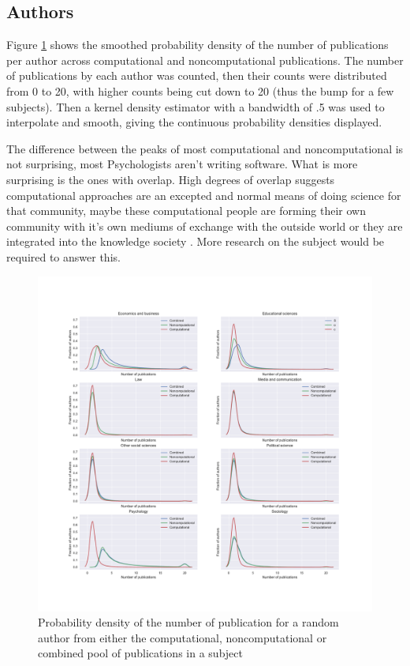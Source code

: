\documentclass[12pt, a4paper]{article}
\begin{document}
\subsection{Authors}

Figure \ref{auths} shows the smoothed probability density of the number of publications per author across computational and noncomputational publications. The number of publications by each author was counted, then their counts were distributed from 0 to 20, with higher counts being cut down to 20 (thus the bump for a few subjects). Then a kernel density estimator with a bandwidth of .5 was used to interpolate and smooth, giving the continuous probability densities displayed.

The difference between the peaks of most computational and noncomputational is not surprising, most Psychologists aren't writing software. What is more surprising is the ones with overlap. High degrees of overlap suggests computational approaches are an excepted and normal means of doing science for that community, maybe these computational people are forming their own community with it's own mediums of exchange with the outside world \citep{star1989institutional} or they are integrated into the knowledge society \citep{cetina2009epistemic}. More research on the subject would be required to answer this.

\begin{figure}[H]
	\centering
	\begin{adjustbox}{center}
		\includegraphics[width=1.2\textwidth]{auths_dist}
	\end{adjustbox}
	\caption{Probability density of the number of publication for a random author from either the computational, noncomputational or combined pool of publications in a subject}\label{auths}
\end{figure}
\end{document}
